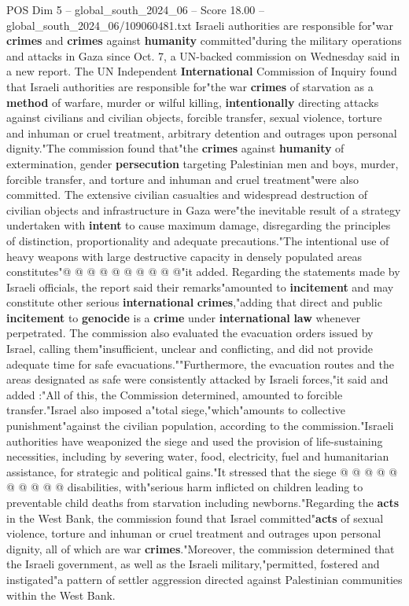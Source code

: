 \begin{textsample}{POS Dim 5 – global\_south\_2024\_06 – Score 18.00 – global\_south\_2024\_06/109060481.txt}  \label{ex:f5_pos_223}
Israeli authorities are responsible for"war \textbf{crimes} and \textbf{crimes} against \textbf{humanity} committed"during the military operations and attacks in Gaza since Oct. 7, a UN-backed commission on Wednesday said in a new report.
The UN Independent \textbf{International} Commission of Inquiry found that Israeli authorities are responsible for"the war \textbf{crimes} of starvation as a \textbf{method} of warfare, murder or wilful killing, \textbf{intentionally} directing attacks against civilians and civilian objects, forcible transfer, sexual violence, torture and inhuman or cruel treatment, arbitrary detention and outrages upon personal dignity."The commission found that"the \textbf{crimes} against \textbf{humanity} of extermination, gender \textbf{persecution} targeting Palestinian men and boys, murder, forcible transfer, and torture and inhuman and cruel treatment"were also committed.
The extensive civilian casualties and widespread destruction of civilian objects and infrastructure in Gaza were"the inevitable result of a strategy undertaken with \textbf{intent} to cause maximum damage, disregarding the principles of distinction, proportionality and adequate precautions."The intentional use of heavy weapons with large destructive capacity in densely populated areas constitutes"@ @ @ @ @ @ @ @ @ @"it added.
Regarding the statements made by Israeli officials, the report said their remarks"amounted to \textbf{incitement} and may constitute other serious \textbf{international} \textbf{crimes},"adding that direct and public \textbf{incitement} to \textbf{genocide} is a \textbf{crime} under \textbf{international} \textbf{law} whenever perpetrated.
The commission also evaluated the evacuation orders issued by Israel, calling them"insufficient, unclear and conflicting, and did not provide adequate time for safe evacuations.""Furthermore, the evacuation routes and the areas designated as safe were consistently attacked by Israeli forces,"it said and added :"All of this, the Commission determined, amounted to forcible transfer."Israel also imposed a"total siege,"which"amounts to collective punishment"against the civilian population, according to the commission."Israeli authorities have weaponized the siege and used the provision of life-sustaining necessities, including by severing water, food, electricity, fuel and humanitarian assistance, for strategic and political gains."It stressed that the siege @ @ @ @ @ @ @ @ @ @ disabilities, with"serious harm inflicted on children leading to preventable child deaths from starvation including newborns."Regarding the \textbf{acts} in the West Bank, the commission found that Israel committed"\textbf{acts} of sexual violence, torture and inhuman or cruel treatment and outrages upon personal dignity, all of which are war \textbf{crimes}."Moreover, the commission determined that the Israeli government, as well as the Israeli military,"permitted, fostered and instigated"a pattern of settler aggression directed against Palestinian communities within the West Bank.

\end{textsample}
